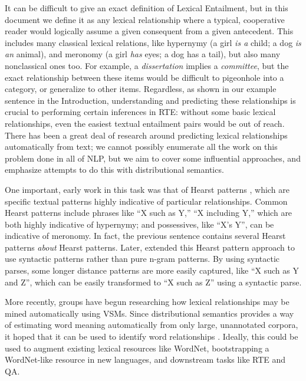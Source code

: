 \documentclass[12pt]{article}
\begin{document}
It can be difficult to give an exact definition of Lexical Entailment, but in
this document we define it as any lexical relationship where a typical,
cooperative reader would logically assume a given consequent from a given
antecedent. This includes many classical lexical relations, like hypernymy (a
girl {\em is a} child; a dog {\em is an} animal), and meronomy (a girl {\em
has} eyes; a dog {has a} tail), but also many nonclassical ones too. For
example, a {\em dissertation} implies a {\em committee}, but the exact
relationship between these items would be difficult to pigeonhole into a
category, or generalize to other items. Regardless, as shown in our example
sentence in the Introduction, understanding and predicting these relationships
is crucial to performing certain inferences in RTE: without some basic lexical
relationships, even the easiest textual entailment pairs would be out of
reach. There has been a great deal of research around predicting lexical
relationships automatically from text; we cannot possibly enumerate all the
work on this problem done in all of NLP, but we aim to cover some influential
approaches, and emphasize attempts to do this with distributional semantics.

One important, early work in this task was that of Hearst patterns
\cite{hearst:1992:coling}, which are specific textual patterns highly
indicative of particular relationships. Common Hearst patterns include
phrases like ``X such as Y,'' ``X including Y,'' which are both highly
indicative of hypernymy; and possessives, like ``X's Y'', can be indicative
of meronomy. In fact, the previous sentence contains several Hearst patterns
{\em about} Hearst patterns. Later,
 extended this Hearst pattern approach
to use syntactic patterns rather than
pure n-gram patterns. By using syntactic parses, some longer distance patterns
are more easily captured, like ``X such as Y and Z'', which can be easily
transformed to ``X such as Z'' using a syntactic parse.

More recently, groups have begun researching how lexical relationships may be
mined automatically using VSMs. Since distributional
semantics provides a way of estimating word meaning automatically from only
large, unannotated corpora, it hoped that it can be used to identify
word relationships \cite{baroni:2011:gems,baroni:2012:eacl}. Ideally, this
could be used to augment existing lexical resources like WordNet, bootstrapping
a WordNet-like resource in new languages, and downstream tasks like RTE and QA.
\end{document}
